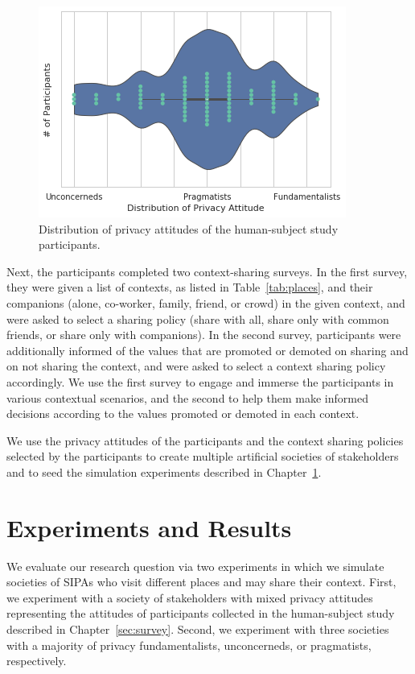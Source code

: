  \begin{figure}
     \centering
     \includegraphics[width=0.6\columnwidth]{./Chapter-4/fig/privacy-attitude-distribution.png}
     \caption[Distribution of privacy attitudes]{Distribution of privacy attitudes of the human-subject study participants. }
     \label{fig:participants-privacy-distribution}
 \end{figure}

Next, the participants completed two context-sharing surveys. 
In the first survey, they were given a list of contexts, as listed in Table~\ref{tab:places}, and their companions (alone, co-worker, family, friend, or crowd) in the given context, and were asked to select a sharing policy (share with all, share only with common friends, or share only with companions). In the second survey, participants were additionally informed of the values that are promoted or demoted on sharing and on not sharing the context, and were asked to select a context sharing policy accordingly. We use the first survey to engage and immerse the participants in various contextual scenarios, and the second to help them make informed decisions according to the values promoted or demoted in each context.

We use the privacy attitudes of the participants and the context sharing policies selected by the participants to create multiple artificial societies of stakeholders and to seed the simulation experiments described in Chapter~\ref{sec:results}. 

\section{Experiments and Results}
\label{sec:results}

We evaluate our research question via two experiments in which we simulate societies of \locationapp SIPAs who visit different places and may share their context. First, we experiment with a society of stakeholders with mixed privacy attitudes representing the attitudes of participants collected in the human-subject study described in Chapter~\ref{sec:survey}. Second, we experiment with three societies with a majority of privacy fundamentalists, unconcerneds, or pragmatists, respectively.

